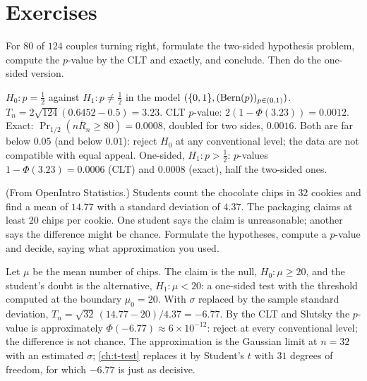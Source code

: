\section{Exercises}
\label{sec:tests-exercises}

\begin{exercise}
\label{ex:tests-kiss-pvalue}
For $80$ of $124$ couples turning right, formulate the two-sided hypothesis problem, compute the $p$-value by the CLT and exactly, and conclude. Then do the one-sided version.
\end{exercise}
\begin{solution}
$H_0: p = \frac12$ against $H_1: p \neq \frac12$ in the model $(\{0,1\}, (\text{Bern}(p))_{p \in (0,1)})$. $T_n = 2\sqrt{124}(0.6452 - 0.5) = 3.23$. CLT $p$-value: $2(1 - \Phi(3.23)) = 0.0012$. Exact: $\Pr_{1/2}(n\bar{R}_n \geq 80) = 0.0008$, doubled for two sides, $0.0016$. Both are far below $0.05$ (and below $0.01$): reject $H_0$ at any conventional level; the data are not compatible with equal appeal. One-sided, $H_1: p > \frac12$: $p$-values $1 - \Phi(3.23) = 0.0006$ (CLT) and $0.0008$ (exact), half the two-sided ones.
\end{solution}

\begin{exercise}
\label{ex:tests-cookies}
(From OpenIntro Statistics.) Students count the chocolate chips in $32$ cookies and find a mean of $14.77$ with a standard deviation of $4.37$. The packaging claims at least $20$ chips per cookie. One student says the claim is unreasonable; another says the difference might be chance. Formulate the hypotheses, compute a $p$-value and decide, saying what approximation you used.
\end{exercise}
\begin{solution}
Let $\mu$ be the mean number of chips. The claim is the null, $H_0: \mu \geq 20$, and the student's doubt is the alternative, $H_1: \mu < 20$: a one-sided test with the threshold computed at the boundary $\mu_0 = 20$. With $\sigma$ replaced by the sample standard deviation, $T_n = \sqrt{32}\,(14.77 - 20)/4.37 = -6.77$. By the CLT and Slutsky the $p$-value is approximately $\Phi(-6.77) \approx 6 \times 10^{-12}$: reject at every conventional level; the difference is not chance. The approximation is the Gaussian limit at $n = 32$ with an estimated $\sigma$; \cref{ch:t-test} replaces it by Student's $t$ with $31$ degrees of freedom, for which $-6.77$ is just as decisive.
\end{solution}

